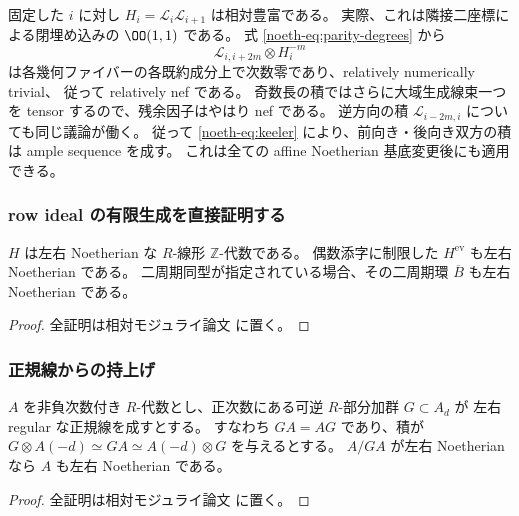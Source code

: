 固定した $i$ に対し $H_i=\mathcal L_i\mathcal L_{i+1}$ は相対豊富である。
実際、これは隣接二座標による閉埋め込みの $\OO(1,1)$ である。
式 \eqref{noeth-eq:parity-degrees} から
\begin{equation}\label{noeth-eq:nef-prefix}
 \mathcal L_{i,i+2m}\otimes H_i^{-m}
\end{equation}
は各幾何ファイバーの各既約成分上で次数零であり、relatively numerically trivial、
従って relatively nef である。
奇数長の積ではさらに大域生成線束一つを tensor するので、残余因子はやはり nef である。
逆方向の積 $\mathcal L_{i-2m,i}$ についても同じ議論が働く。
従って \eqref{noeth-eq:keeler} により、前向き・後向き双方の積は ample sequence を成す。
これは全ての affine Noetherian 基底変更後にも適用できる。

\subsubsection{row ideal の有限生成を直接証明する}

\begin{lemma}\label{noeth-lem:row-noetherian}
$H$ は左右 Noetherian な $R$-線形 $\mathbb Z$-代数である。
偶数添字に制限した $H^{\mathrm{ev}}$ も左右 Noetherian である。
二周期同型が指定されている場合、その二周期環 $\overline B$ も左右 Noetherian である。
\end{lemma}

\begin{proof}
全証明は相対モジュライ論文 \cite[\texttt{relative_cubic_noetherian}]{QuadricModuli2026} に置く。
\end{proof}

\subsubsection{正規線からの持上げ}

\begin{lemma}\label{noeth-lem:normal-lift}
$A$ を非負次数付き $R$-代数とし、正次数にある可逆 $R$-部分加群 $G\subset A_d$ が
左右 regular な正規線を成すとする。
すなわち $GA=AG$ であり、積が
$G\otimes A(-d)\simeq GA\simeq A(-d)\otimes G$ を与えるとする。
$A/GA$ が左右 Noetherian なら $A$ も左右 Noetherian である。
\end{lemma}

\begin{proof}
全証明は相対モジュライ論文 \cite[\texttt{relative_cubic_noetherian}]{QuadricModuli2026} に置く。
\end{proof}


